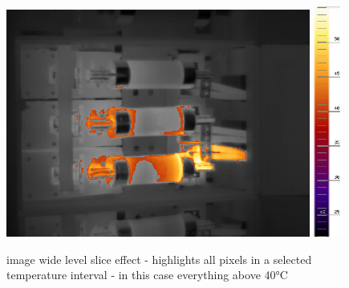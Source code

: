 \documentclass[12pt,twoside,a4paper,notitlepage]{report}
\begin{document}
\begin{figure}[ht]
 \centering
 \includegraphics[width=10cm, keepaspectratio=true]{img/FLIR_P60_hl_ls}
 \includegraphics[width=9.5mm, keepaspectratio=true]{img/FLIR_P60_orig_scale}
 \caption{image wide level slice effect - highlights all pixels in a selected temperature interval - in this case everything above 40°C}
 \label{fig:tools-export-level-slice}
\end{figure}
\end{document}
